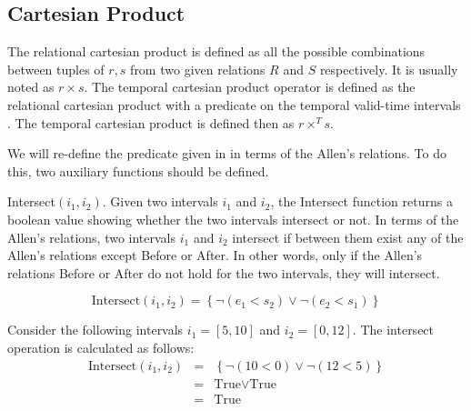 \subsection{\label{sec:cartesian-product}Cartesian Product}
The relational cartesian product is defined as all the possible combinations between tuples of  $r, s$ from two given relations $R$ and $S$ respectively. It is usually noted as $r \times s$.
The temporal cartesian product operator is defined as the relational cartesian product with a predicate on the temporal valid-time intervals \cite{DengfengGao2002}. The temporal cartesian product is defined then as $r \times^T s$.

We will re-define the predicate given in \cite{DengfengGao2002} in terms of the Allen's relations. To do this, two auxiliary functions should be defined.


\begin{definition}
 \label{def:crisp-intersect}
Intersect$\left(i_1, i_2 \right)$. Given two intervals $i_1$ and $i_2$, the Intersect function returns a boolean value showing whether the two intervals intersect or not. In terms of the Allen's relations, two intervals $i_1$ and $i_2$ intersect if between them exist any of the Allen's relations except Before or After. In other words, only if the Allen's relations Before or After do not hold for the two intervals, they will intersect.

\begin{equation}
 \label{eq:crisp-intersect}
\mbox{Intersect}\left( i_1, i_2 \right) = \left \lbrace \neg \left(e_1 < s_2 \right) \vee \neg \left(e_2 < s_1 \right) \right \rbrace
\end{equation}


\end{definition}


\begin{example}
Consider the following intervals $i_1 = \left[5, 10 \right]$ and  $i_2 = \left[0, 12 \right]$. The intersect operation is calculated as follows:
\begin{align}
\mbox{Intersect}\left( i_1, i_2 \right) &=& \left \lbrace \neg \left(10 < 0 \right)  \vee \neg \left(12 < 5 \right) \right \rbrace \\
\nonumber
&=& \mbox{True} \vee \mbox{True} \\
\nonumber &=& \mbox{True}
\end{align}

\end{example}

